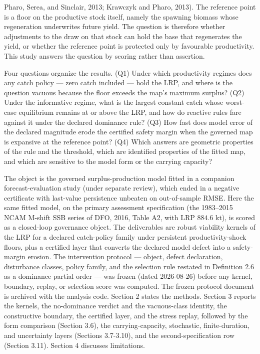\documentclass[11pt]{article}
\begin{document}
Pharo, Serea, and Sinclair, 2013; Krawczyk and Pharo, 2013). The
reference point is a floor on the productive stock itself, namely the
spawning biomass whose regeneration underwrites future yield. The
question is therefore whether adjustments to the draw on that stock can
hold the base that regenerates the yield, or whether the reference point
is protected only by favourable productivity. This study answers the
question by scoring rather than assertion.

Four questions organize the results. (Q1) Under which productivity
regimes does any catch policy --- zero catch included --- hold the LRP,
and where is the question vacuous because the floor exceeds the map's
maximum surplus? (Q2) Under the informative regime, what is the largest
constant catch whose worst-case equilibrium remains at or above the LRP,
and how do reactive rules fare against it under the declared dominance
rule? (Q3) How fast does model error of the declared magnitude erode the
certified safety margin when the governed map is expansive at the
reference point? (Q4) Which answers are geometric properties of the rule
and the threshold, which are identified properties of the fitted map,
and which are sensitive to the model form or the carrying capacity?

The object is the governed surplus-production model fitted in a
companion forecast-evaluation study (under separate review), which ended
in a negative certificate with last-value persistence unbeaten on
out-of-sample RMSE. Here the same fitted model, on the primary
assessment specification (the 1983--2015 NCAM M-shift SSB series of DFO,
2016, Table A2, with LRP \(884.6\) kt), is scored as a closed-loop
governance object. The deliverables are robust viability kernels of the
LRP for a declared catch-policy family under persistent
productivity-shock floors, plus a certified layer that converts the
declared model defect into a safety-margin erosion. The intervention
protocol --- object, defect declaration, disturbance classes, policy
family, and the selection rule restated in Definition 2.6 as a dominance
partial order --- was frozen (dated 2026-08-26) before any kernel,
boundary, replay, or selection score was computed. The frozen protocol
document is archived with the analysis code. Section 2 states the
methods. Section 3 reports the kernels, the no-dominance verdict and the
vacuous-class identity, the constructive boundary, the certified layer,
and the stress replay, followed by the form comparison (Section 3.6),
the carrying-capacity, stochastic, finite-duration, and uncertainty
layers (Sections 3.7-3.10), and the second-specification row (Section
3.11). Section 4 discusses limitations.
\end{document}
